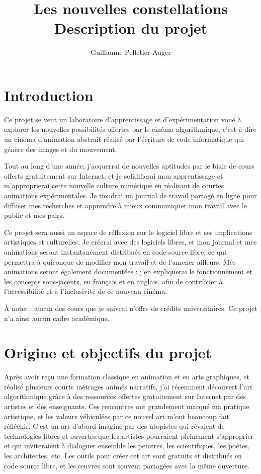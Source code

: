 \documentclass[12pt]{article}
\author{\Large \authorfont Guillaume Pelletier-Auger}
\title{\Huge Les nouvelles constellations\protect\\Description du projet}
\date{}
\begin{document}
\maketitle

\section{Introduction}
\noindent Ce projet se veut un laboratoire d'apprentissage et d'expérimentation voué à explorer les nouvelles possibilités offertes par le cinéma algorithmique, c'est-à-dire un cinéma d'animation abstrait réalisé par l'écriture de code informatique qui génère des images et du mouvement.

Tout au long d’une année, j'acquerrai de nouvelles aptitudes par le biais de cours offerts gratuitement sur Internet, et je solidifierai mon apprentissage et m'approprierai cette nouvelle culture numérique en réalisant de courtes animations expérimentales. Je tiendrai un journal de travail partagé en ligne pour diffuser mes recherches et apprendre à mieux communiquer mon travail avec le public et mes pairs.

Ce projet sera aussi un espace de réflexion sur le logiciel libre et ses implications artistiques et culturelles. Je créerai avec des logiciels libres, et mon journal et mes animations seront instantanément distribués en code source libre, ce qui permettra à quiconque de modifier mon travail et de l'amener ailleurs. Mes animations seront également documentées : j'en expliquerai le fonctionnement et les concepts sous-jacents, en français et en anglais, afin de contribuer à l'accessibilité et à l'inclusivité de ce nouveau cinéma.

À noter : aucun des cours que je suivrai n'offre de crédits universitaires. Ce projet n'a ainsi aucun cadre académique.

\section{Origine et objectifs du projet}
\noindent Après avoir reçu une formation classique en animation et en arts graphiques, et réalisé plusieurs courts métrages animés narratifs, j'ai récemment découvert l'art algorithmique grâce à des ressources offertes gratuitement sur Internet par des artistes et des enseignants. Ces rencontres ont grandement marqué ma pratique artistique, et les valeurs véhiculées par ce nouvel art m'ont beaucoup fait réfléchir. C'est un art d'abord imaginé par des utopistes qui rêvaient de technologies libres et ouvertes que les artistes pourraient pleinement s'approprier et qui inviteraient à dialoguer ensemble les peintres, les scientifiques, les poètes, les architectes, etc. Les outils pour créer cet art sont gratuits et distribués en code source libre, et les \oe{}uvres sont souvent partagées avec la même ouverture.
\end{document}
